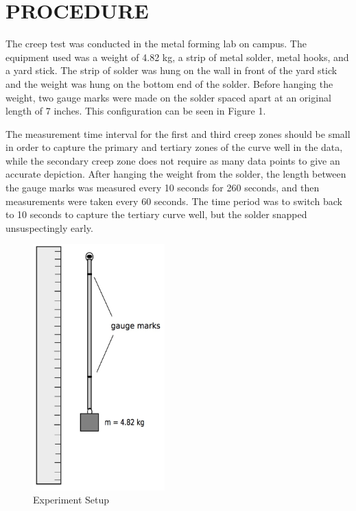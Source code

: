 \documentclass[12pt]{article}
\begin{document}
\section*{\fontsize{12}{12}\selectfont PROCEDURE}
The creep test was conducted in the metal forming lab on campus. The equipment used was a weight of 4.82 kg, a strip of metal solder, metal hooks, and a yard stick. The strip of solder was hung on the wall in front of the yard stick and the weight was hung on the bottom end of the solder. Before hanging the weight, two gauge marks were made on the solder spaced apart at an original length of 7 inches. This configuration can be seen in Figure 1. 
\bigskip

The measurement time interval for the first and third creep zones should be small in order to capture the primary and tertiary zones of the curve well in the data, while the secondary creep zone does not require as many data points to give an accurate depiction. After hanging the weight from the solder, the length between the gauge marks was measured every 10 seconds for 260 seconds, and then measurements were taken every 60 seconds. The time period was to switch back to 10 seconds to capture the tertiary curve well, but the solder snapped unsuspectingly early. 

\newpage

\begin{figure}[htbp] %
   \centering
   \includegraphics[width=2in]{experiment_setup.jpg} 
   \caption{Experiment Setup}
\end{figure}
\bigskip
\end{document}
